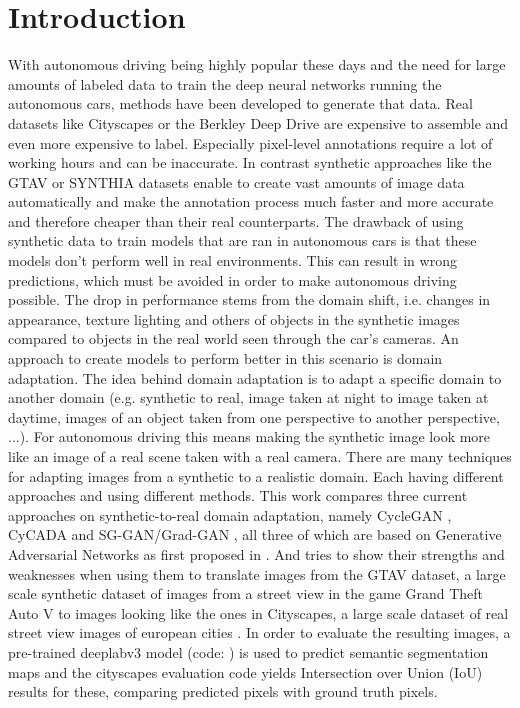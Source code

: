 \chapter{Introduction}

With autonomous driving being highly popular these days and the need for large amounts of labeled data to train the deep neural networks running the autonomous cars, methods have been developed to generate that data. Real datasets like Cityscapes \cite{Cordts_2016_CVPR} or the Berkley Deep Drive \cite{DBLP:journals/corr/abs-1805-04687} are expensive to assemble and even more expensive to label. Especially pixel-level annotations require a lot of working hours and can be inaccurate. In contrast synthetic approaches like the GTAV \cite{Richter_2016_ECCV} or SYNTHIA datasets \cite{RosCVPR16} enable to create vast amounts of image data automatically and make the annotation process much faster and more accurate and therefore cheaper than their real counterparts. The drawback of using synthetic data to train models that are ran in autonomous cars is that these models don't perform well in real environments. This can result in wrong predictions, which must be avoided in order to make autonomous driving possible. The drop in performance stems from the domain shift, i.e. changes in appearance, texture lighting and others of objects in the synthetic images compared to objects in the real world seen through the car's cameras. An approach to create models to perform better in this scenario is domain adaptation. The idea behind domain adaptation is to adapt a specific domain to another domain (e.g. synthetic to real, image taken at night to image taken at daytime, images of an object taken from one perspective to another perspective, ...). For autonomous driving this means making the synthetic image look more like an image of a real scene taken with a real camera. There are many techniques for adapting images from a synthetic to a realistic domain. Each having different approaches and using different methods. This work compares three current approaches on synthetic-to-real domain adaptation, namely CycleGAN \cite{DBLP:journals/corr/ZhuPIE17}, CyCADA \cite{DBLP:journals/corr/abs-1711-03213} and SG-GAN/Grad-GAN \cite{DBLP:journals/corr/abs-1801-01726}, all three of which are based on Generative Adversarial Networks as first proposed in \cite{NIPS2014_5423}. And tries to show their strengths and weaknesses when using them to translate images from the GTAV dataset, a large scale synthetic dataset of images from a street view in the game Grand Theft Auto V \cite{Richter_2016_ECCV} to images looking like the ones in Cityscapes, a large scale dataset of real street view images of european cities \cite{Cordts_2016_CVPR}. In order to evaluate the resulting images, a pre-trained deeplabv3 \cite{DBLP:journals/corr/ChenPSA17} model (code: \cite{DLR}) is used to predict semantic segmentation maps and the cityscapes evaluation code \cite{CSR} yields Intersection over Union (IoU) results for these, comparing predicted pixels with ground truth pixels. 